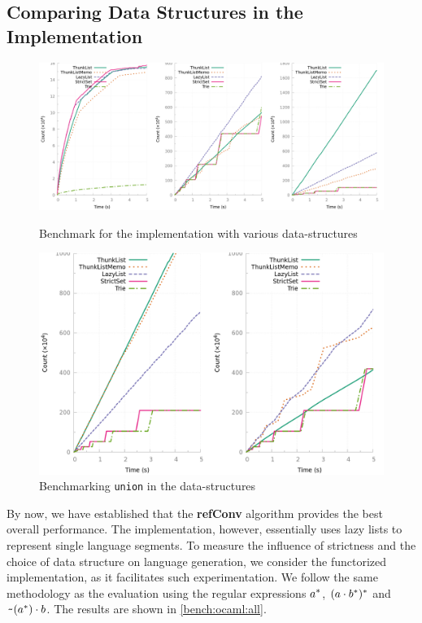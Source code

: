 \subsection{Comparing Data Structures in the \ocaml Implementation}
\label{sec:bench:ocaml}
\begin{figure}[tp]
  \centering
  \includegraphics[width=\linewidth]{measure/ocaml_all.png}
  \caption{Benchmark for the \ocaml implementation with various data-structures}
  \label{bench:ocaml:all}
  \includegraphics[width=0.66\linewidth]{measure/ocaml_union.png}
  \caption{Benchmarking \texttt{union} in the \ocaml data-structures}
  \label{bench:ocaml:union}
\end{figure}

By now, we have established that the \textbf{refConv} algorithm
provides the best overall performance.  The \haskell implementation,
however, essentially uses lazy lists to represent single language
segments. To measure the influence of strictness and the choice of data structure on
language generation, we consider the functorized \ocaml implementation, as it facilitates such experimentation.
We follow the same methodology as the \haskell evaluation using the
regular expressions $a^*$, $(a \cdot{b^*})^*$ and
$\texttt{\textasciitilde}{(a^*)} \cdot{b}$.  The results are shown in
\cref{bench:ocaml:all}.


